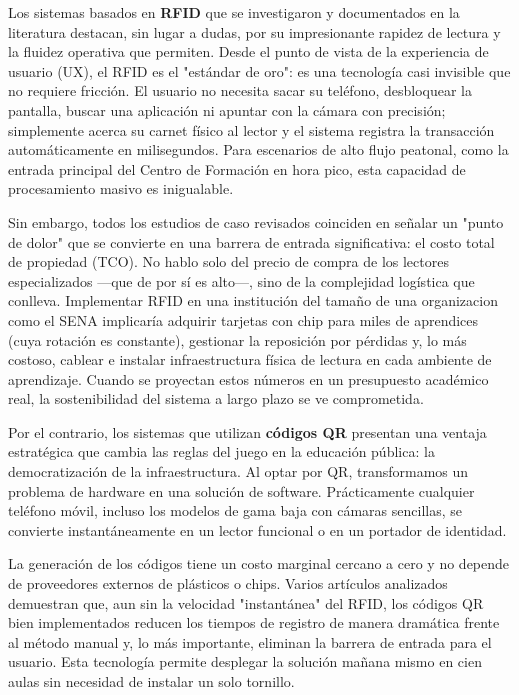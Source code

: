Los sistemas basados en \textbf{RFID} que se investigaron y documentados en la literatura destacan, sin lugar a dudas, por su impresionante rapidez de lectura y la fluidez operativa que permiten. Desde el punto de vista de la experiencia de usuario (UX), el RFID es el "estándar de oro": es una tecnología casi invisible que no requiere fricción. El usuario no necesita sacar su teléfono, desbloquear la pantalla, buscar una aplicación ni apuntar con la cámara con precisión; simplemente acerca su carnet físico al lector y el sistema registra la transacción automáticamente en milisegundos. Para escenarios de alto flujo peatonal, como la entrada principal del Centro de Formación en hora pico, esta capacidad de procesamiento masivo es inigualable.

Sin embargo, todos los estudios de caso revisados coinciden en señalar un "punto de dolor" que se convierte en una barrera de entrada significativa: el costo total de propiedad (TCO). No hablo solo del precio de compra de los lectores especializados —que de por sí es alto—, sino de la complejidad logística que conlleva. Implementar RFID en una institución del tamaño de una organizacion como el SENA implicaría adquirir tarjetas con chip para miles de aprendices (cuya rotación es constante), gestionar la reposición por pérdidas y, lo más costoso, cablear e instalar infraestructura física de lectura en cada ambiente de aprendizaje. Cuando se proyectan estos números en un presupuesto académico real, la sostenibilidad del sistema a largo plazo se ve comprometida.

Por el contrario, los sistemas que utilizan \textbf{códigos QR} presentan una ventaja estratégica que cambia las reglas del juego en la educación pública: la democratización de la infraestructura. Al optar por QR, transformamos un problema de hardware en una solución de software. Prácticamente cualquier teléfono móvil, incluso los modelos de gama baja con cámaras sencillas, se convierte instantáneamente en un lector funcional o en un portador de identidad.

La generación de los códigos tiene un costo marginal cercano a cero y no depende de proveedores externos de plásticos o chips. Varios artículos analizados demuestran que, aun sin la velocidad "instantánea" del RFID, los códigos QR bien implementados reducen los tiempos de registro de manera dramática frente al método manual y, lo más importante, eliminan la barrera de entrada para el usuario. Esta tecnología permite desplegar la solución mañana mismo en cien aulas sin necesidad de instalar un solo tornillo.

